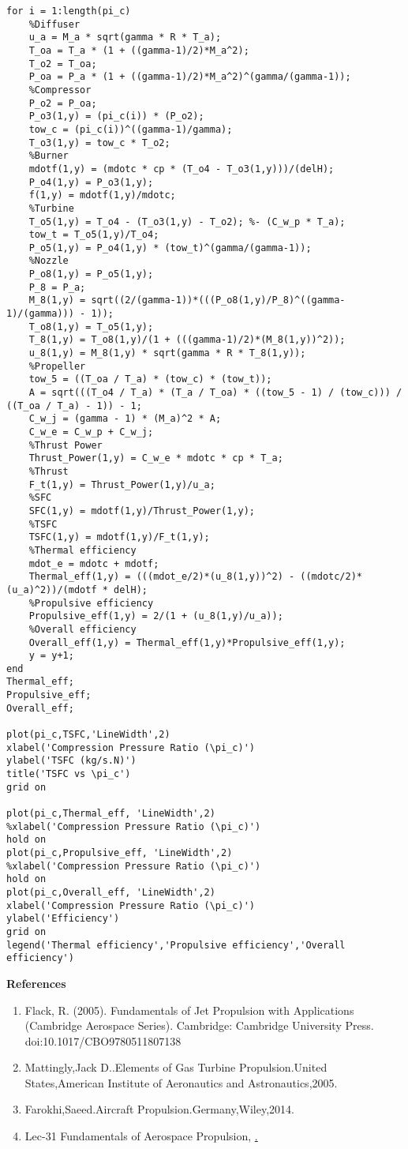 \documentclass[]{article}
\theoremstyle{definition}
\begin{document}
\begin{lstlisting}[style=Matlab-editor]
for i = 1:length(pi_c)
    %Diffuser
    u_a = M_a * sqrt(gamma * R * T_a);
    T_oa = T_a * (1 + ((gamma-1)/2)*M_a^2);
    T_o2 = T_oa;
    P_oa = P_a * (1 + ((gamma-1)/2)*M_a^2)^(gamma/(gamma-1));
    %Compressor
    P_o2 = P_oa;
    P_o3(1,y) = (pi_c(i)) * (P_o2);
    tow_c = (pi_c(i))^((gamma-1)/gamma);
    T_o3(1,y) = tow_c * T_o2;
    %Burner
    mdotf(1,y) = (mdotc * cp * (T_o4 - T_o3(1,y)))/(delH);
    P_o4(1,y) = P_o3(1,y);
    f(1,y) = mdotf(1,y)/mdotc;
    %Turbine
    T_o5(1,y) = T_o4 - (T_o3(1,y) - T_o2); %- (C_w_p * T_a);
    tow_t = T_o5(1,y)/T_o4;
    P_o5(1,y) = P_o4(1,y) * (tow_t)^(gamma/(gamma-1));
    %Nozzle
    P_o8(1,y) = P_o5(1,y);
    P_8 = P_a;
    M_8(1,y) = sqrt((2/(gamma-1))*(((P_o8(1,y)/P_8)^((gamma-1)/(gamma))) - 1));
    T_o8(1,y) = T_o5(1,y);
    T_8(1,y) = T_o8(1,y)/(1 + (((gamma-1)/2)*(M_8(1,y))^2));
    u_8(1,y) = M_8(1,y) * sqrt(gamma * R * T_8(1,y));
    %Propeller
    tow_5 = ((T_oa / T_a) * (tow_c) * (tow_t));
    A = sqrt(((T_o4 / T_a) * (T_a / T_oa) * ((tow_5 - 1) / (tow_c))) / ((T_oa / T_a) - 1)) - 1;
    C_w_j = (gamma - 1) * (M_a)^2 * A;
    C_w_e = C_w_p + C_w_j;
    %Thrust Power
    Thrust_Power(1,y) = C_w_e * mdotc * cp * T_a;
    %Thrust
    F_t(1,y) = Thrust_Power(1,y)/u_a;
    %SFC
    SFC(1,y) = mdotf(1,y)/Thrust_Power(1,y);
    %TSFC
    TSFC(1,y) = mdotf(1,y)/F_t(1,y);
    %Thermal efficiency
    mdot_e = mdotc + mdotf;
    Thermal_eff(1,y) = (((mdot_e/2)*(u_8(1,y))^2) - ((mdotc/2)*(u_a)^2))/(mdotf * delH);
    %Propulsive efficiency
    Propulsive_eff(1,y) = 2/(1 + (u_8(1,y)/u_a));
    %Overall efficiency
    Overall_eff(1,y) = Thermal_eff(1,y)*Propulsive_eff(1,y);
    y = y+1;
end
Thermal_eff;
Propulsive_eff;
Overall_eff;

plot(pi_c,TSFC,'LineWidth',2)
xlabel('Compression Pressure Ratio (\pi_c)')
ylabel('TSFC (kg/s.N)')
title('TSFC vs \pi_c')
grid on

plot(pi_c,Thermal_eff, 'LineWidth',2)
%xlabel('Compression Pressure Ratio (\pi_c)')
hold on
plot(pi_c,Propulsive_eff, 'LineWidth',2)
%xlabel('Compression Pressure Ratio (\pi_c)')
hold on
plot(pi_c,Overall_eff, 'LineWidth',2)
xlabel('Compression Pressure Ratio (\pi_c)')
ylabel('Efficiency')
grid on
legend('Thermal efficiency','Propulsive efficiency','Overall efficiency')
\end{lstlisting}

\begin{center}
{\bf References}
\end{center}
\begin{enumerate}
    \item Flack, R. (2005). Fundamentals of Jet Propulsion with Applications (Cambridge Aerospace Series). Cambridge: Cambridge University Press. doi:10.1017/CBO9780511807138
    \item Mattingly,Jack D..Elements of Gas Turbine Propulsion.United States,American Institute of Aeronautics and Astronautics,2005.
    \item Farokhi,Saeed.Aircraft Propulsion.Germany,Wiley,2014.
    \item Lec-31 Fundamentals of Aerospace Propulsion, \href{https://youtu.be/x7jw5cJWydY}.
\end{enumerate}
\end{document}
